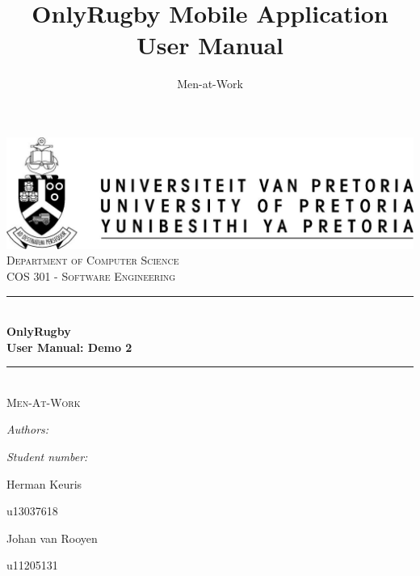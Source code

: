 \documentclass[hidelinks,a4paper,12pt]{article}
\author{Men-at-Work}
\title{ OnlyRugby Mobile Application User Manual}
\newcommand{\HRule}{\rule{\linewidth}{0.5mm}}
\begin{document}
\setlength{\parskip}{6pt}

\begin{titlepage}

\begin{center}
\includegraphics[width=1\textwidth]{./images/up-logo.jpg}\\[0.4cm]    
\textsc{\LARGE Department of Computer Science}\\[1.5cm]
\textsc{\Large COS 301 - Software Engineering}\\[0.5cm]
\HRule \\[0.4cm]
{ \huge \bfseries OnlyRugby}\\[0.4cm]
{ \huge \bfseries User Manual: Demo 2}\\[0.4cm]
\HRule \\[0.4cm]
\textsc{\Large Men-At-Work}\\[0.5cm]
\begin{minipage}{0.4\textwidth}
\begin{flushleft} \large
\emph{Authors:}
\end{flushleft}
\end{minipage}
\begin{minipage}{0.4\textwidth}
\begin{flushright} \large
\emph{Student number:}
\end{flushright}
\end{minipage}

\begin{minipage}{0.4\textwidth}
\begin{flushleft} \large
Herman {Keuris}
\end{flushleft}
\end{minipage}
\begin{minipage}{0.4\textwidth}
\begin{flushright} \large
\emph{}
u13037618
\end{flushright}
\end{minipage}

\begin{minipage}{0.4\textwidth}
\begin{flushleft} \large
Johan {van Rooyen}
\end{flushleft}
\end{minipage}
\begin{minipage}{0.4\textwidth}
\begin{flushright} \large
\emph{}
u11205131
\end{flushright}
\end{minipage}


\end{center}
\end{titlepage}
\end{document}
